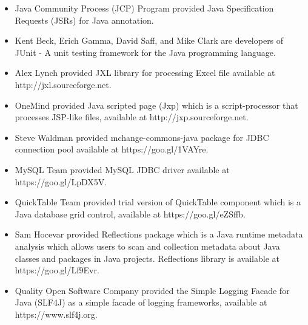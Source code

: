 \documentclass[a4paper,twoside]{article}
\begin{document}
\begin{itemize}
\item Java Community Process (JCP) Program provided Java Specification Requests (JSRs) for Java annotation.
\item Kent Beck, Erich Gamma, David Saff, and Mike Clark are developers of JUnit - A unit testing framework for the Java programming language.
\item Alex Lynch provided JXL library for processing Excel file available at http://jxl.sourceforge.net.
\item OneMind provided Java scripted page (Jxp) which is a script-processor that processes JSP-like files, available at http://jxp.sourceforge.net.
\item Steve Waldman provided mchange-commons-java package for JDBC connection pool available at https://goo.gl/1VAYre.
\item MySQL Team provided MySQL JDBC driver available at https://goo.gl/LpDX5V.
\item QuickTable Team provided trial version of QuickTable component which is a Java database grid control, available at https://goo.gl/eZSffb.
\item Sam Hocevar provided Reflections package which is a Java runtime metadata analysis which allows users to scan and collection metadata about Java classes and packages in Java projects. Reflections library is available at https://goo.gl/Lf9Evr.
\item Quality Open Software Company provided the Simple Logging Facade for Java (SLF4J) as a simple facade of logging frameworks, available at https://www.slf4j.org.
\end{itemize}


{\small
}

\vfill
\end{document}
